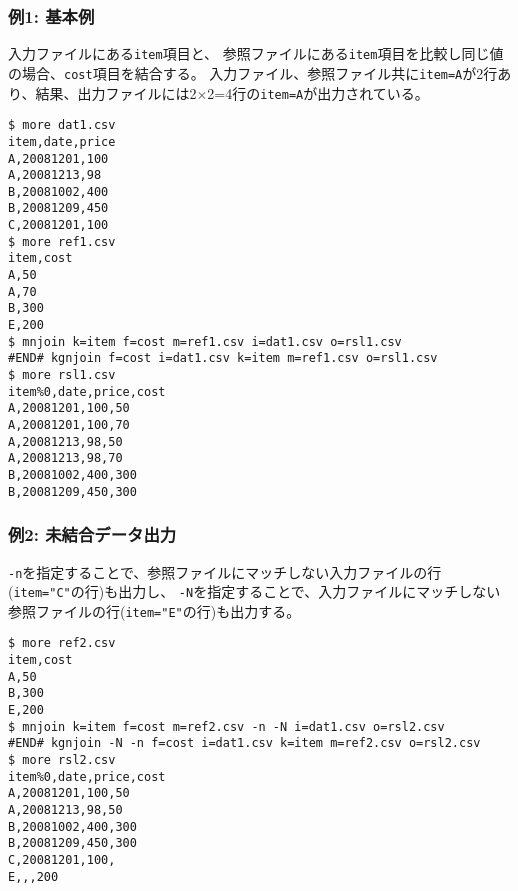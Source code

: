 \subsubsection*{例1: 基本例}

入力ファイルにある\verb|item|項目と、
参照ファイルにある\verb|item|項目を比較し同じ値の場合、\verb|cost|項目を結合する。
入力ファイル、参照ファイル共に\verb|item=A|が2行あり、結果、出力ファイルには2$\times$2=4行の\verb|item=A|が出力されている。


\begin{Verbatim}[baselinestretch=0.7,frame=single]
$ more dat1.csv
item,date,price
A,20081201,100
A,20081213,98
B,20081002,400
B,20081209,450
C,20081201,100
$ more ref1.csv
item,cost
A,50
A,70
B,300
E,200
$ mnjoin k=item f=cost m=ref1.csv i=dat1.csv o=rsl1.csv
#END# kgnjoin f=cost i=dat1.csv k=item m=ref1.csv o=rsl1.csv
$ more rsl1.csv
item%0,date,price,cost
A,20081201,100,50
A,20081201,100,70
A,20081213,98,50
A,20081213,98,70
B,20081002,400,300
B,20081209,450,300
\end{Verbatim}
\subsubsection*{例2: 未結合データ出力}

\verb|-n|を指定することで、参照ファイルにマッチしない入力ファイルの行(\verb|item="C"|の行)も出力し、
\verb|-N|を指定することで、入力ファイルにマッチしない参照ファイルの行(\verb|item="E"|の行)も出力する。


\begin{Verbatim}[baselinestretch=0.7,frame=single]
$ more ref2.csv
item,cost
A,50
B,300
E,200
$ mnjoin k=item f=cost m=ref2.csv -n -N i=dat1.csv o=rsl2.csv
#END# kgnjoin -N -n f=cost i=dat1.csv k=item m=ref2.csv o=rsl2.csv
$ more rsl2.csv
item%0,date,price,cost
A,20081201,100,50
A,20081213,98,50
B,20081002,400,300
B,20081209,450,300
C,20081201,100,
E,,,200
\end{Verbatim}
